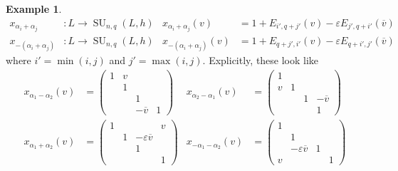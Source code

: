 \documentclass[12pt]{article}
\theoremstyle{definition}
\newtheorem{example}[theorem]{Example}
\newcommand{\eps}{\varepsilon}
\newcommand{\ov}{\overline}
\DeclareMathOperator{\SU}{SU}
\begin{document}
\begin{example}
\begin{align*}
	x_{\alpha_i + \alpha_j}&:L \to \SU_{n,q}(L,h) & x_{\alpha_i + \alpha_j}(v) &= 1 + E_{i',q+j'}(v) - \eps E_{j',q+i'}(\ov v) \\
	x_{-(\alpha_i + \alpha_j)}&:L \to \SU_{n,q}(L,h) & x_{-(\alpha_i + \alpha_j)}(v) &= 1 + E_{q+j',i'}(v) - \eps E_{q+i',j'}( \ov v)
\end{align*}
where $i' = \min(i,j)$ and $j' = \max(i,j)$. Explicitly, these look like
\begin{align*}
	x_{\alpha_1 - \alpha_2}(v) &=
	\begin{pmatrix}
		1 & v \\
		& 1 \\
		&& 1 \\
		&& - \ov v & 1
	\end{pmatrix}
	 &
	x_{\alpha_2 - \alpha_1}(v) &=
	\begin{pmatrix}
		1 \\
		v & 1 && \\
		&& 1 & - \ov v \\
		&&& 1
	\end{pmatrix} \\[2ex]
	x_{\alpha_1 + \alpha_2}(v) &= 
		\begin{pmatrix}
		1 &&& v \\
		& 1 & - \eps \ov v \\
		&& 1 \\
		&&& 1
	\end{pmatrix} 
	&
	x_{-\alpha_1 - \alpha_2}(v) &=
	\begin{pmatrix}
		1 \\
		& 1 \\
		& - \eps \ov v & 1 \\
		v &&& 1
	\end{pmatrix} 
\end{align*}
\end{example}
\end{document}
